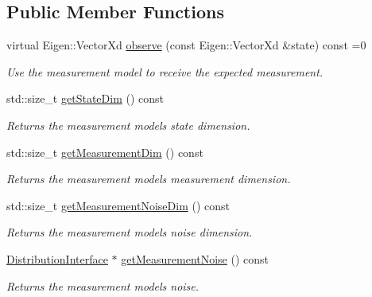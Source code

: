 \subsection*{Public Member Functions}
\begin{DoxyCompactItemize}
\item 
virtual Eigen\+::\+Vector\+Xd \hyperlink{classrefill_1_1MeasurementModelBase_a3a5613bc1ba3317e35436fc78b0d2972}{observe} (const Eigen\+::\+Vector\+Xd \&state) const =0
\begin{DoxyCompactList}\small\item\em Use the measurement model to receive the expected measurement. \end{DoxyCompactList}\item 
std\+::size\+\_\+t \hyperlink{classrefill_1_1MeasurementModelBase_ab87e4a5df150595abe7afcedf2b88b0f}{get\+State\+Dim} () const 
\begin{DoxyCompactList}\small\item\em Returns the measurement models state dimension. \end{DoxyCompactList}\item 
std\+::size\+\_\+t \hyperlink{classrefill_1_1MeasurementModelBase_a089b5d23a0cbbfd4ebaa02a2f2a297a9}{get\+Measurement\+Dim} () const 
\begin{DoxyCompactList}\small\item\em Returns the measurement models measurement dimension. \end{DoxyCompactList}\item 
std\+::size\+\_\+t \hyperlink{classrefill_1_1MeasurementModelBase_a0217dce62430f0888a56d7c7a4cbae28}{get\+Measurement\+Noise\+Dim} () const 
\begin{DoxyCompactList}\small\item\em Returns the measurement models noise dimension. \end{DoxyCompactList}\item 
\hyperlink{classrefill_1_1DistributionInterface}{Distribution\+Interface} $\ast$ \hyperlink{classrefill_1_1MeasurementModelBase_a3012ee640691c9b96e76168e35acdb44}{get\+Measurement\+Noise} () const 
\begin{DoxyCompactList}\small\item\em Returns the measurement models noise. \end{DoxyCompactList}\end{DoxyCompactItemize}
